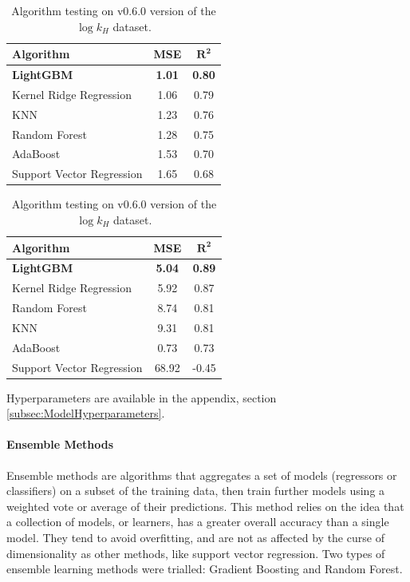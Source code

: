\documentclass[11pt, titlepage]{article}
\begin{document}
\begin{table}[H]
	\begin{minipage}{.5\linewidth}
		\centering
		\small
		\begin{tabular}{|l|c|c|}
			\hline
			\textbf{Algorithm} & \textbf{MSE} & $\mathbf{R^2}$\\
			\hline
			\textbf{LightGBM} & \textbf{1.01} & \textbf{0.80} \\
			Kernel Ridge Regression & 1.06 & 0.79 \\
			KNN & 1.23 & 0.76 \\
			Random Forest & 1.28 & 0.75 \\
			AdaBoost & 1.53 & 0.70 \\
			Support Vector Regression & 1.65 & 0.68\\
			\hline
		\end{tabular}
		\caption{Algorithm testing on v0.6.0 version of the $\log S$ dataset.}
		\label{tab:AlgLogS}
	\end{minipage}
	\begin{minipage}{.5\linewidth}
		\centering
		\small
		\begin{tabular}{|l|c|c|}
			\hline
			\textbf{Algorithm} & \textbf{MSE} & $\mathbf{R^2}$\\
			\hline
			\textbf{LightGBM}  & \textbf{5.04}& \textbf{0.89} \\
			Kernel Ridge Regression & 5.92	  & 0.87		  \\
			Random Forest	   & 8.74		  & 0.81		  \\
			KNN & 9.31		  & 0.81		  \\
			AdaBoost		   & 0.73		  & 0.73		  \\
			Support Vector Regression & 68.92 & -0.45		  \\
			\hline
		\end{tabular}
		\caption{Algorithm testing on v0.6.0 version of the $\log k_H$ dataset.}
		\label{tab:AlgLogH}
	\end{minipage}
\end{table}

Hyperparameters are available in the appendix, section \ref{subsec:ModelHyperparameters}.
\paragraph*{Ensemble Methods}
Ensemble methods are algorithms that aggregates a set of models (regressors or classifiers) on a subset of the training data, then train further models using a weighted vote or average of their predictions\cite{EnsembleMethods}. This method relies on the idea that a collection of models, or learners, has a greater overall accuracy than a single model. They tend to avoid overfitting, and are not as affected by the curse of dimensionality as other methods\cite{Ensemble_IBM}, like support vector regression. Two types of ensemble learning methods were trialled: Gradient Boosting and Random Forest.
\end{document}
